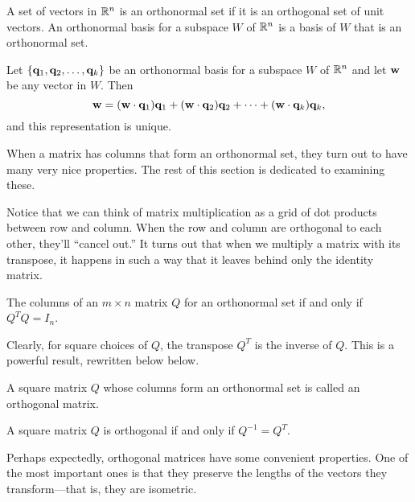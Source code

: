 \documentclass[../m73main.tex]{subfiles}
\begin{document}
\begin{definition}
	A set of vectors in $\mathbb{R}^n$ is an orthonormal set if it is an orthogonal set of unit vectors.
	An orthonormal basis for a subspace $W$ of $\mathbb{R}^n$ is a basis of $W$ that is an orthonormal set.
\end{definition}

\begin{theorem}
	Let $\{\mathbf{q}_1, \mathbf{q}_2, \ldots, \mathbf{q}_k\}$ be an orthonormal basis for a subspace $W$ of $\mathbb{R}^n$ and let $\mathbf{w}$ be any vector in $W$.
	Then
	\[ \mathbf{w} = (\mathbf{w} \cdot \mathbf{q}_1) \mathbf{q}_1 + (\mathbf{w} \cdot \mathbf{q}_2) \mathbf{q}_2 + \cdots + (\mathbf{w} \cdot \mathbf{q}_k) \mathbf{q}_k,\]
	and this representation is unique.
\end{theorem}

When a matrix has columns that form an orthonormal set, they turn out to have many very nice properties.
The rest of this section is dedicated to examining these.

Notice that we can think of matrix multiplication as a grid of dot products between row and column.
When the row and column are orthogonal to each other, they'll ``cancel out.''
It turns out that when we multiply a matrix with its transpose, it happens in such a way that it leaves behind only the identity matrix.

\begin{theorem}
	The columns of an $m \times n$ matrix $Q$ for an orthonormal set if and only if $Q^T Q = I_n$.
\end{theorem}

Clearly, for square choices of $Q$, the transpose $Q^T$ is the inverse of $Q$.
This is a powerful result, rewritten below below.

\begin{definition}
	A square matrix $Q$ whose columns form an orthonormal set is called an orthogonal matrix.
\end{definition}

\begin{theorem}
	A square matrix $Q$ is orthogonal if and only if $Q^{-1} = Q^T$.
\end{theorem}

Perhaps expectedly, orthogonal matrices have some convenient properties.
One of the most important ones is that they preserve the lengths of the vectors they transform---that is, they are isometric.
\end{document}
